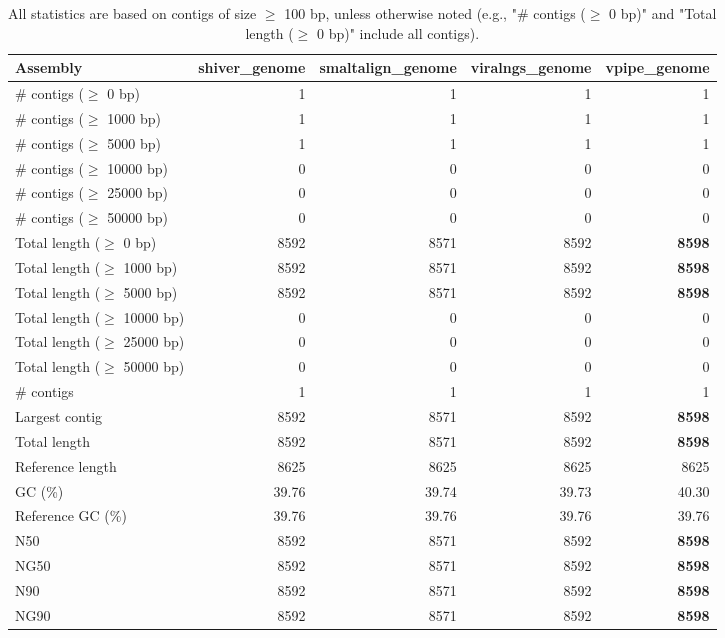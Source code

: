 \documentclass[12pt,a4paper]{article}
\begin{document}
\begin{table}[ht]
\begin{center}
\caption{All statistics are based on contigs of size $\geq$ 100 bp, unless otherwise noted (e.g., "\# contigs ($\geq$ 0 bp)" and "Total length ($\geq$ 0 bp)" include all contigs).}
\begin{tabular}{|l*{4}{|r}|}
\hline
Assembly & shiver\_genome & smaltalign\_genome & viralngs\_genome & vpipe\_genome \\ \hline
\# contigs ($\geq$ 0 bp) & 1 & 1 & 1 & 1 \\ \hline
\# contigs ($\geq$ 1000 bp) & 1 & 1 & 1 & 1 \\ \hline
\# contigs ($\geq$ 5000 bp) & 1 & 1 & 1 & 1 \\ \hline
\# contigs ($\geq$ 10000 bp) & 0 & 0 & 0 & 0 \\ \hline
\# contigs ($\geq$ 25000 bp) & 0 & 0 & 0 & 0 \\ \hline
\# contigs ($\geq$ 50000 bp) & 0 & 0 & 0 & 0 \\ \hline
Total length ($\geq$ 0 bp) & 8592 & 8571 & 8592 & {\bf 8598} \\ \hline
Total length ($\geq$ 1000 bp) & 8592 & 8571 & 8592 & {\bf 8598} \\ \hline
Total length ($\geq$ 5000 bp) & 8592 & 8571 & 8592 & {\bf 8598} \\ \hline
Total length ($\geq$ 10000 bp) & 0 & 0 & 0 & 0 \\ \hline
Total length ($\geq$ 25000 bp) & 0 & 0 & 0 & 0 \\ \hline
Total length ($\geq$ 50000 bp) & 0 & 0 & 0 & 0 \\ \hline
\# contigs & 1 & 1 & 1 & 1 \\ \hline
Largest contig & 8592 & 8571 & 8592 & {\bf 8598} \\ \hline
Total length & 8592 & 8571 & 8592 & {\bf 8598} \\ \hline
Reference length & 8625 & 8625 & 8625 & 8625 \\ \hline
GC (\%) & 39.76 & 39.74 & 39.73 & 40.30 \\ \hline
Reference GC (\%) & 39.76 & 39.76 & 39.76 & 39.76 \\ \hline
N50 & 8592 & 8571 & 8592 & {\bf 8598} \\ \hline
NG50 & 8592 & 8571 & 8592 & {\bf 8598} \\ \hline
N90 & 8592 & 8571 & 8592 & {\bf 8598} \\ \hline
NG90 & 8592 & 8571 & 8592 & {\bf 8598} \\ \hline

\end{tabular}
\end{center}
\end{table}
\end{document}
